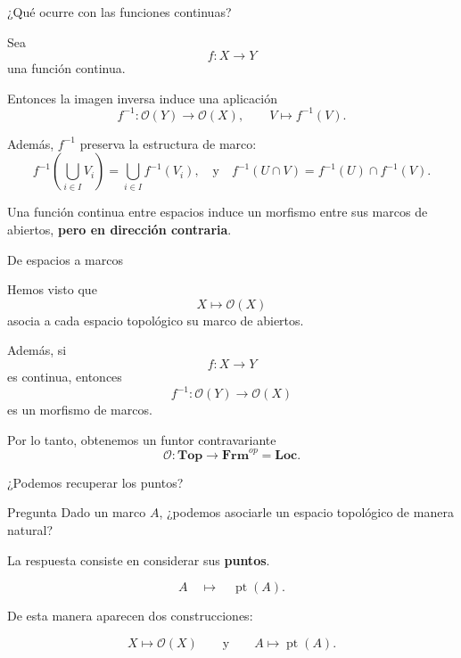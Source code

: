 \documentclass[compress,12pt]{beamer}
\begin{document}
\begin{frame}{¿Qué ocurre con las funciones continuas?}
\small{
Sea
\[
    f:X\longrightarrow Y
\]
una función continua.

\pause

Entonces la imagen inversa induce una aplicación
\[
    f^{-1}:\mathcal O(Y)\longrightarrow\mathcal O(X),
    \qquad
    V\longmapsto f^{-1}(V).
\]

\pause


Además, $f^{-1}$ preserva la estructura de marco:
\[
    f^{-1}\left(\bigcup_{i\in I}V_i\right)
    =
    \bigcup_{i\in I}f^{-1}(V_i),
\quad\text{y}\quad
    f^{-1}(U\cap V)
    =
    f^{-1}(U)\cap f^{-1}(V).
\]

\centering
Una función continua entre espacios induce un morfismo
entre sus marcos de abiertos, \textbf{pero en dirección contraria}.
}
\end{frame}

\begin{frame}{De espacios a marcos}
\small{
Hemos visto que
\[
    X \longmapsto \mathcal O(X)
\]
asocia a cada espacio topológico su marco de abiertos.

\pause

Además, si
\[
    f:X\longrightarrow Y
\]
es continua, entonces
\[
    f^{-1}:\mathcal O(Y)\longrightarrow\mathcal O(X)
\]
es un morfismo de marcos.

\pause

\medskip

Por lo tanto, obtenemos un funtor contravariante
\[
    \mathcal O:\mathbf{Top}\longrightarrow\mathbf{Frm}^{op}=\mathbf{Loc}.
\]
}
\end{frame}

\begin{frame}{¿Podemos recuperar los puntos?}
\small{
\begin{block}{Pregunta}
Dado un marco $A$, ¿podemos asociarle un espacio topológico
de manera natural?
\end{block}

\pause

\medskip

La respuesta consiste en considerar sus \textbf{puntos}.

\[
    A
    \quad\longmapsto\quad
    \operatorname{pt}(A).
\]

\pause

\vfill

De esta manera aparecen dos construcciones:

\[
\boxed{
    X\longmapsto\mathcal O(X)
    \qquad\text{y}\qquad
    A\longmapsto\operatorname{pt}(A).
}
\]
}
\end{frame}
\end{document}
